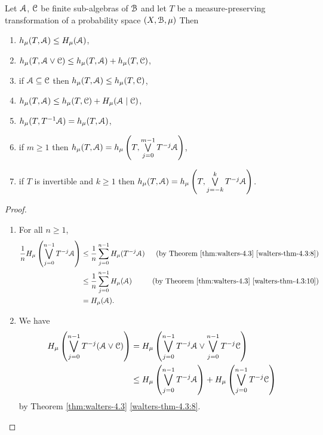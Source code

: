 \begin{theorem} \label{thm:walters-4.12}
	Let $\mathcal{A}$, $\mathcal{C}$ be finite sub-algebras of $\mathcal{B}$ and let $T$ be a measure-preserving transformation of a probability space $(X, \mathcal{B}, \mu)$ Then
	\begin{enumerate}
		\item $h_\mu(T, \mathcal{A}) \leq H_\mu(\mathcal{A})$, \label{walters:thm-4-12:1}
		\item $h_\mu(T, \mathcal{A} \vee \mathcal{C}) \leq h_\mu(T, \mathcal{A}) + h_\mu(T, \mathcal{C})$, \label{walters:thm-4-12:2}
		\item if $\mathcal{A} \subseteq \mathcal{C}$ then $h_\mu(T, \mathcal{A}) \leq h_\mu(T, \mathcal{C})$, \label{walters:thm-4-12:3}
		\item $h_\mu(T, \mathcal{A}) \leq h_\mu(T, \mathcal{C}) + H_\mu(\mathcal{A} \mid \mathcal{C})$, \label{walters:thm-4-12:4}
		\item $h_\mu(T, T^{-1}{\mathcal{A}}) = h_\mu(T, \mathcal{A})$, \label{walters:thm-4-12:5}
		\item if $m \geq 1$ then $h_\mu(T, \mathcal{A}) = h_\mu\left(T, \bigvee\limits_{j = 0}^{m - 1}{T^{-j}{\mathcal{A}}}\right)$, \label{walters:thm-4-12:6}
		\item if $T$ is invertible and $k \geq 1$ then $h_\mu(T, \mathcal{A}) = h_\mu\left(T, \bigvee\limits_{j = -k}^k{T^{-j}{\mathcal{A}}}\right)$. \label{walters:thm-4-12:7}
	\end{enumerate}
	\begin{proof} \hfill
		\begin{enumerate}
			\item For all $n \geq 1$,
				\begin{align*}
					\frac{1}{n} H_\mu\left(\bigvee_{j = 0}^{n - 1}{T^{-j}{\mathcal{A}}}\right) &\leq \frac{1}{n} \sum_{j = 0}^{n - 1}{H_\mu({T^{-j}{\mathcal{A}}})} & \text{(by Theorem \ref{thm:walters-4.3} \ref{walters-thm-4.3:8})} \\
						&\leq \frac{1}{n} \sum_{j = 0}^{n - 1}{H_\mu(\mathcal{A})} & \text{(by Theorem \ref{thm:walters-4.3} \ref{walters-thm-4.3:10})} \\
						&= H_\mu(\mathcal{A}).
				\end{align*}
			\item We have
				\begin{align*}
					H_\mu\left(\bigvee_{j = 0}^{n - 1}{T^{-j}(\mathcal{A} \vee \mathcal{C})}\right) &= H_\mu\left(\bigvee_{j = 0}^{n - 1}{T^{-j}{\mathcal{A}}} \vee \bigvee_{j = 0}^{n - 1}{T^{-j}{\mathcal{C}}}\right) \\
						&\leq H_\mu\left(\bigvee_{j = 0}^{n - 1}{T^{-j}{\mathcal{A}}}\right) + H_\mu\left(\bigvee_{j = 0}^{n - 1}{T^{-j}{\mathcal{C}}}\right)
				\end{align*}
				by Theorem \ref{thm:walters-4.3} \ref{walters-thm-4.3:8}.

\end{enumerate}
\end{proof}
\end{theorem}
